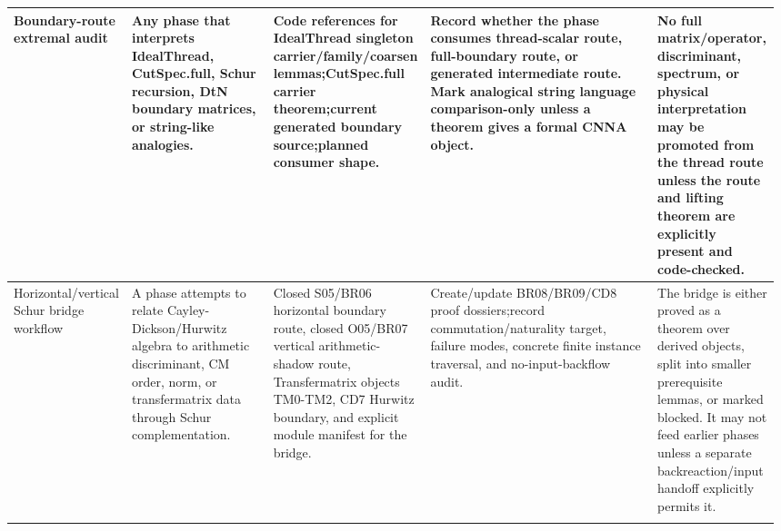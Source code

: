 \begin{longtable}{L{0.14\linewidth} L{0.19\linewidth} L{0.18\linewidth} L{0.31\linewidth} L{0.16\linewidth}}
\hline
\addlinespace[0.24em]
Boundary-route extremal audit & Any phase that interprets IdealThread, CutSpec.full, Schur recursion, DtN boundary matrices, or string-like analogies. & Code references for IdealThread singleton carrier/\allowbreak{}family/\allowbreak{}coarsen lemmas;\newline CutSpec.full carrier theorem;\newline current generated boundary source;\newline planned consumer shape. & Record whether the phase consumes thread-scalar route, full-boundary route, or generated intermediate route. Mark analogical string language comparison-only unless a theorem gives a formal CNNA object. & No full matrix/\allowbreak{}operator, discriminant, spectrum, or physical interpretation may be promoted from the thread route unless the route and lifting theorem are explicitly present and code-checked.\\
\hline
\addlinespace[0.24em]
Horizontal/\allowbreak{}vertical Schur bridge workflow & A phase attempts to relate Cayley-Dickson/\allowbreak{}Hurwitz algebra to arithmetic discriminant, CM order, norm, or transfermatrix data through Schur complementation. & Closed S05/\allowbreak{}BR06 horizontal boundary route, closed O05/\allowbreak{}BR07 vertical arithmetic-shadow route, Transfermatrix objects TM0-TM2, CD7 Hurwitz boundary, and explicit module manifest for the bridge. & Create/\allowbreak{}update BR08/\allowbreak{}BR09/\allowbreak{}CD8 proof dossiers;\newline record commutation/\allowbreak{}naturality target, failure modes, concrete finite instance traversal, and no-input-backflow audit. & The bridge is either proved as a theorem over derived objects, split into smaller prerequisite lemmas, or marked blocked. It may not feed earlier phases unless a separate backreaction/\allowbreak{}input handoff explicitly permits it.\\
\hline
\addlinespace[0.24em]

\end{longtable}
